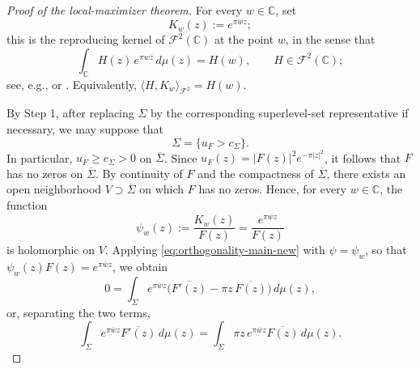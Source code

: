 \documentclass[a4paper,11pt,reqno]{amsart}
\numberwithin{equation}{section}
\theoremstyle{plain} %
\theoremstyle{definition} %
\theoremstyle{remark}
\newcommand{\C}{\mathbb{C}}
\begin{document}
\begin{proof}[Proof of the local-maximizer theorem]
For every \(w\in \C\), set
\[
K_w(z):=e^{\pi \overline w z};
\]
this is the reproducing kernel of \(\mathcal F^2(\C)\) at the point \(w\), in
the sense that
\begin{equation}\label{eq:reproducing-kernel}
\int_\C H(z)\,e^{\pi w \overline z}\,d\mu(z)=H(w),
\qquad H\in\mathcal F^2(\C);
\end{equation}
see, e.g., \cite[Ch.~1]{Folland} or \cite{Bargmann}. Equivalently,
\(\langle H,K_w\rangle_{\mathcal F^2}=H(w)\).

By Step 1, after replacing \(\Sigma\) by the corresponding superlevel-set
representative if necessary, we may suppose that
\[
\Sigma=\{u_F>c_\Sigma\}.
\]
In particular, \(u_F\ge c_\Sigma>0\) on \(\overline \Sigma\). Since
\(u_F(z)=|F(z)|^2e^{-\pi |z|^2}\), it follows that \(F\) has no zeros on
\(\overline \Sigma\). By continuity of \(F\) and the compactness of
\(\overline \Sigma\), there exists an open neighborhood
\(V\supset \overline \Sigma\) on which \(F\) has no zeros. Hence, for every
\(w\in \C\), the function
\[
\psi_w(z):=\frac{K_w(z)}{F(z)}=\frac{e^{\pi\overline wz}}{F(z)}
\]
is holomorphic on \(V\). Applying \eqref{eq:orthogonality-main-new} with
\(\psi=\psi_w\), so that
\(\psi_w(z)F(z)=e^{\pi\overline w z}\), we obtain
\[
0=
\int_\Sigma
e^{\pi \overline wz}
\Big(\overline{F'(z)}-\pi z\,\overline{F(z)}\Big)\,d\mu(z),
\]
or, separating the two terms,
\begin{equation}\label{eq:key-kernel-identity-new}
\int_\Sigma
e^{\pi \overline wz}\overline{F'(z)}\,d\mu(z)
=
\int_\Sigma
\pi z\,e^{\pi \overline wz}\overline{F(z)}\,d\mu(z).
\end{equation}


\end{proof}
\end{document}
